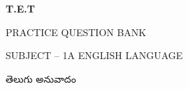 \documentclass[12pt,a4paper]{article}
\newcommand{\en}[1]{{\englishfont #1}}
\begin{document}
\begin{titlepage}
  \centering
  \vspace*{0.28\textheight}
  {\en{\Huge\bfseries T.E.T}\par}
  \vspace{1.2em}
  {\en{\LARGE PRACTICE QUESTION BANK}\par}
  \vspace{2.5em}
  {\en{\Large SUBJECT – 1A ENGLISH LANGUAGE}\par}
  \vspace{1.5em}
  {\Large తెలుగు అనువాదం\par}
\end{titlepage}














\end{document}
